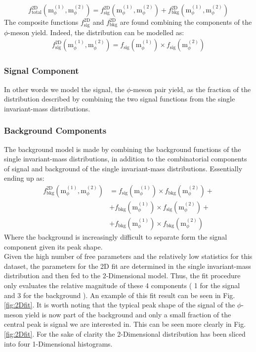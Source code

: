 \begin{equation}
f^{\text{2D}}_{\text{total}}(\text{m}_{\phi}^{(1)},\text{m}_{\phi}^{(2)}) = f^{\text{2D}}_{\text{sig}}(\text{m}_{\phi}^{(1)},\text{m}_{\phi}^{(2)}) + f^{\text{2D}}_{\text{bkg}}(\text{m}_{\phi}^{(1)},\text{m}_{\phi}^{(2)}) 
\end{equation}
\indent The composite functions $ f^{\text{2D}}_{\text{sig}}$ and $ f^{\text{2D}}_{\text{bkg}}$ are found combining the components of the $\phi$-meson yield. Indeed, the distribution can be modelled as:
\begin{eqnarray}
 f^{\text{2D}}_{\text{sig}}(\text{m}_{\phi}^{(1)},\text{m}_{\phi}^{(2)}) =  f_{\text{sig}}(\text{m}_{\phi}^{(1)}) \times  f_{\text{sig}}(\text{m}_{\phi}^{(2)})
 \end{eqnarray}
\subsubsection{Signal Component} In other words we model the signal, the $\phi$-meson pair yield, as the fraction of the distribution described by combining the two signal functions from the single invariant-mass distributions.
\subsubsection{Background Components} The background model is made by combining the background functions of the single invariant-mass distributions, in addition to the combinatorial components of signal and background of the single invariant-mass distributions. Essentially ending up as:
\begin{eqnarray}
 f^{\text{2D}}_{\text{bkg}}(\text{m}_{\phi}^{(1)},\text{m}_{\phi}^{(2)}) &= f_{\text{sig}}(\text{m}_{\phi}^{(1)}) \times  f_{\text{bkg}}(\text{m}_{\phi}^{(2)}) +\\
&+ f_{\text{bkg}}(\text{m}_{\phi}^{(1)}) \times  f_{\text{sig}}(\text{m}_{\phi}^{(2)}) +\\
&+ f_{\text{bkg}}(\text{m}_{\phi}^{(1)}) \times  f_{\text{bkg}}(\text{m}_{\phi}^{(2)}) 
\end{eqnarray}
Where the background is increasingly difficult to separate form the signal component given its peak shape.\\
\indent Given the high number of free parameters and the relatively low statistics for this dataset, the parameters  for the 2D fit are determined in the single invariant-mass distribution and then fed to the 2-Dimensional model. Thus, the fit procedure only evaluates the relative magnitude of these 4 components ( 1 for the signal and 3 for the background ). An example of this fit result can be seen in Fig. \ref{fig:2Dfit}. It is worth noting that the typical peak shape of the signal of the $\phi$-meson yield is now part of the background and only a small fraction of the central peak is signal we are interested in. This can be seen more clearly in Fig. \ref{fig:2Dfit}. For the sake of clarity the 2-Dimensional distribution has been sliced into four 1-Dimensional histograms.

